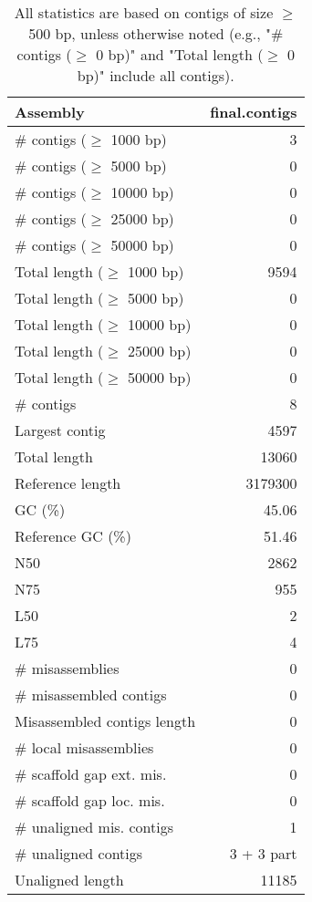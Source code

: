 \documentclass[12pt,a4paper]{article}
\begin{document}
\begin{table}[ht]
\begin{center}
\caption{All statistics are based on contigs of size $\geq$ 500 bp, unless otherwise noted (e.g., "\# contigs ($\geq$ 0 bp)" and "Total length ($\geq$ 0 bp)" include all contigs).}
\begin{tabular}{|l*{1}{|r}|}
\hline
Assembly & final.contigs \\ \hline
\# contigs ($\geq$ 1000 bp) & 3 \\ \hline
\# contigs ($\geq$ 5000 bp) & 0 \\ \hline
\# contigs ($\geq$ 10000 bp) & 0 \\ \hline
\# contigs ($\geq$ 25000 bp) & 0 \\ \hline
\# contigs ($\geq$ 50000 bp) & 0 \\ \hline
Total length ($\geq$ 1000 bp) & 9594 \\ \hline
Total length ($\geq$ 5000 bp) & 0 \\ \hline
Total length ($\geq$ 10000 bp) & 0 \\ \hline
Total length ($\geq$ 25000 bp) & 0 \\ \hline
Total length ($\geq$ 50000 bp) & 0 \\ \hline
\# contigs & 8 \\ \hline
Largest contig & 4597 \\ \hline
Total length & 13060 \\ \hline
Reference length & 3179300 \\ \hline
GC (\%) & 45.06 \\ \hline
Reference GC (\%) & 51.46 \\ \hline
N50 & 2862 \\ \hline
N75 & 955 \\ \hline
L50 & 2 \\ \hline
L75 & 4 \\ \hline
\# misassemblies & 0 \\ \hline
\# misassembled contigs & 0 \\ \hline
Misassembled contigs length & 0 \\ \hline
\# local misassemblies & 0 \\ \hline
\# scaffold gap ext. mis. & 0 \\ \hline
\# scaffold gap loc. mis. & 0 \\ \hline
\# unaligned mis. contigs & 1 \\ \hline
\# unaligned contigs & 3 + 3 part \\ \hline
Unaligned length & 11185 \\ \hline

\end{tabular}
\end{center}
\end{table}
\end{document}

